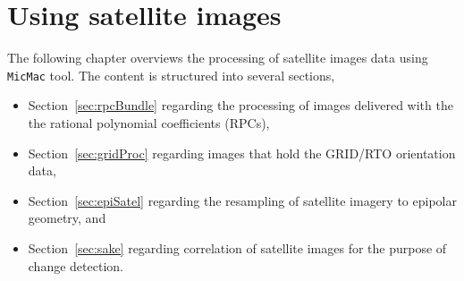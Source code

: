 \chapter{Using satellite images}\label{ch:useSat}
%
The following chapter overviews the processing of satellite images data using \texttt{MicMac} tool. The content is structured into several sections, 
\begin{itemize}
\item Section~\ref{sec:rpcBundle} regarding the processing of images delivered with the the rational polynomial coefficients (RPCs),
\item Section~\ref{sec:gridProc} regarding images that hold the GRID/RTO orientation data,
\item Section~\ref{sec:epiSatel} regarding the resampling of satellite imagery to epipolar geometry, and
\item Section~\ref{sec:sake} regarding correlation of satellite images for the purpose of change detection.
\end{itemize}
 
%
